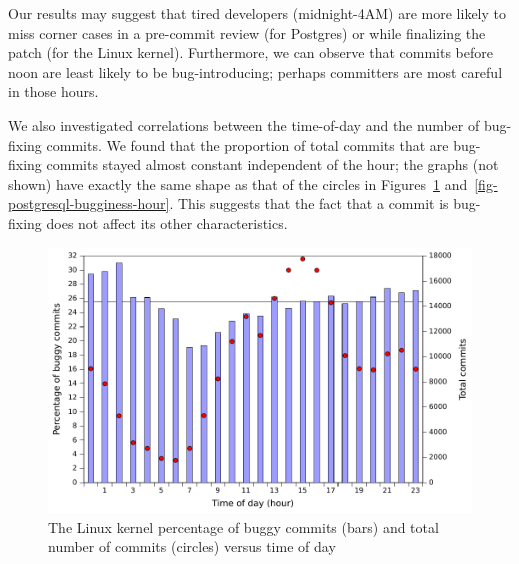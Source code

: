 Our results may suggest that tired developers (midnight-4AM) are more
likely to miss corner cases in a pre-commit review (for Postgres) or
while finalizing the patch (for the Linux kernel). Furthermore, we can observe
that commits before noon are least likely to be bug-introducing;
perhaps committers are most careful in those hours.

We also investigated correlations between the time-of-day and the
number of bug-fixing commits. We found that the proportion of total
commits that are bug-fixing commits stayed almost constant independent
of the hour; the graphs (not shown) have exactly the same shape as
that of the circles in Figures~\ref{fig-linux-bugginess-hour}
and~\ref{fig-postgresql-bugginess-hour}. This suggests that the fact
that a commit is bug-fixing does not affect its other characteristics.

\begin{figure}
\begin{center}
\includegraphics[width=\columnwidth]{linux-bugginess-hour.pdf}
\end{center}
\caption{The Linux kernel percentage of buggy commits (bars) and total number of commits (circles) versus time of day}
\label{fig-linux-bugginess-hour}
\end{figure}

